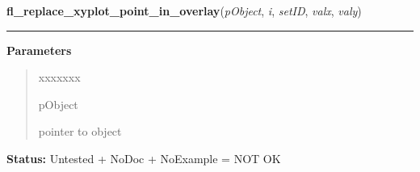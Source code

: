 \hspace{.8\funcindent}\begin{boxedminipage}{\funcwidth}

    \raggedright \textbf{fl\_replace\_xyplot\_point\_in\_overlay}(\textit{pObject}, \textit{i}, \textit{setID}, \textit{valx}, \textit{valy})

    \vspace{-1.5ex}

    \rule{\textwidth}{0.5\fboxrule}
\setlength{\parskip}{2ex}
\setlength{\parskip}{1ex}
      \textbf{Parameters}
      \vspace{-1ex}

      \begin{quote}
        \begin{Ventry}{xxxxxxx}

          \item[pObject]

          pointer to object

        \end{Ventry}

      \end{quote}

\textbf{Status:} Untested + NoDoc + NoExample = NOT OK



    \end{boxedminipage}

    \label{xformslib:library:fl_get_xyplot_xmapping}

    \vspace{0.5ex}

